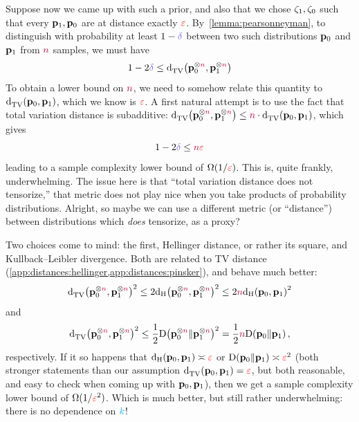 Suppose now we came up with such a prior, and also that we chose $\zeta_1,\zeta_0$ such that every $\mathbf{p}_1, \mathbf{p}_0$ are at distance exactly $\textcolor{red}{\varepsilon}$. By~\cref{lemma:pearsonneyman}, to distinguish with probability at least $1-\errprob$ between two such distributions $\mathbf{p}_0$ and $\mathbf{p}_1$ from ${\textcolor{purple}{n}}$ samples, we must have
\begin{equation}
	\label{eq:naive:distinguish}
	1- 2\errprob \leq \totalvardist{\p_0^{\otimes\ns}}{\p_1^{\otimes\ns}}
\end{equation}
To obtain a lower bound on ${\textcolor{purple}{n}}$, we need to somehow relate this quantity to $\totalvardist{\p_0}{\p_1}$, which we know is $\textcolor{red}{\varepsilon}$. A first natural attempt is to use the fact that total variation distance is subadditive: $\totalvardist{\p_0^{\otimes\ns}}{\p_1^{\otimes\ns}} \leq \ns \cdot \totalvardist{\p_0}{\p_1}$, which gives
\begin{equation}
	1- 2\errprob \leq \ns\dst
\end{equation}
leading to a sample complexity lower bound of $\Omega(1/\textcolor{red}{\varepsilon})$. This is, quite frankly, underwhelming. The issue here is that ``total variation distance does not tensorize,'' \ie that metric does not play nice when you take products of probability distributions. Alright, so maybe we can use a different metric (or ``distance'') between distributions which \emph{does} tensorize, as a proxy?

Two choices come to mind: the first, Hellinger distance, or rather its square, and Kullback--Leibler divergence. Both are related to TV distance (\cref{app:distances:hellinger,app:distances:pinsker}), and behave much better:
\begin{equation}
	\totalvardist{\p_0^{\otimes\ns}}{\p_1^{\otimes\ns}}^2 \leq 2\hellinger{\p_0^{\otimes\ns}}{\p_1^{\otimes\ns}}^2 \leq 2\ns \hellinger{\p_0}{\p_1}^2
\end{equation}
and
\begin{equation}
	\totalvardist{\p_0^{\otimes\ns}}{\p_1^{\otimes\ns}}^2 \leq \frac{1}{2}\kldiv{\p_0^{\otimes\ns}}{\p_1^{\otimes\ns}}^2 = \frac{1}{2}\ns \kldiv{\p_0}{\p_1}\,,
\end{equation}
respectively. If it so happens that $\hellinger{\p_0}{\p_1}\asymp \dst$ or $\kldiv{\p_0}{\p_1}\asymp \dst^2$ (both stronger statements than our assumption $\totalvardist{\p_0}{\p_1}=\dst$, but both reasonable, and easy to check when coming up with $\mathbf{p}_0,\mathbf{p}_1$), then we get a sample complexity lower bound of $\Omega(1/\textcolor{red}{\varepsilon}^2)$. Which is much better, but still rather underwhelming: there is no dependence on ${\textcolor{cyan}{k}}$!


